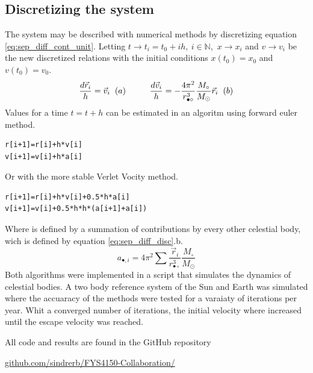 \documentclass[twoside,twocolumn]{article}
\newcommand{\nl}{
	
	\medskip
	\noindent
}
\newcommand{\sun}{\odot}
\newcommand{\planet}{\bullet}
\begin{document}
\subsection{Discretizing the system}
The system may be described with numerical methods by discretizing equation \ref{eq:sep_diff_cont_unit}. Letting  $t\rightarrow t_i=t_0+ih,\ i\in \mathbb{N}$,\ $x\rightarrow x_i$ and $v\rightarrow v_i$ be the new discretized relations with the initial conditions $x(t_0)=x_0$ and $v(t_0)=v_0$. 
\begin{equation}
\frac{d \vec r_i}{h} = \vec v_i\hspace{0.2cm}(a)\hspace{1cm}
\frac{d \vec v_i}{h} =-\frac{4\pi^2}{r_{\planet\circ
}^3}\frac{M_\circ}{M_\sun}\vec r_i\hspace{0.2cm}(b)\label{eq:sep_diff_disc}
\end{equation}
Values for a time $t=t+h$ can be estimated in an algoritm using forward euler method.
\begin{lstlisting}[style=customc]
r[i+1]=r[i]+h*v[i]
v[i+1]=v[i]+h*a[i]
\end{lstlisting}
Or with the more stable Verlet Vocity method.
\begin{lstlisting}[style=customc]
r[i+1]=r[i]+h*v[i]+0.5*h*a[i]
v[i+1]=v[i]+0.5*h*h*(a[i+1]+a[i])
\end{lstlisting}
Where is defined by a summation of contributions by every other celestial body, wich is defined by equation \ref{eq:sep_diff_disc}.b. 
\begin{equation}
a_{\planet,i} = 4\pi^2\sum \frac{\vec r_i}{r_{\planet\circ
}^3}\frac{M_\circ}{M_\sun}\label{eq:acc}
\end{equation}
Both algorithms were implemented in a script that simulates the dynamics of celestial bodies. A two body reference system of the Sun and Earth was simulated where the accuaracy of the methods were tested for a varaiaty of iterations per year. Whit a converged number of iterations, the initial velocity where increased until the escape velocity was reached.

All code and results are found in the GitHub repository\nl
{\small \href{https://github.com/sindrerb/FYS4150-Collaboration/tree/master/Doc/Project3}{github.com/sindrerb/FYS4150-Collaboration/}}
\end{document}
